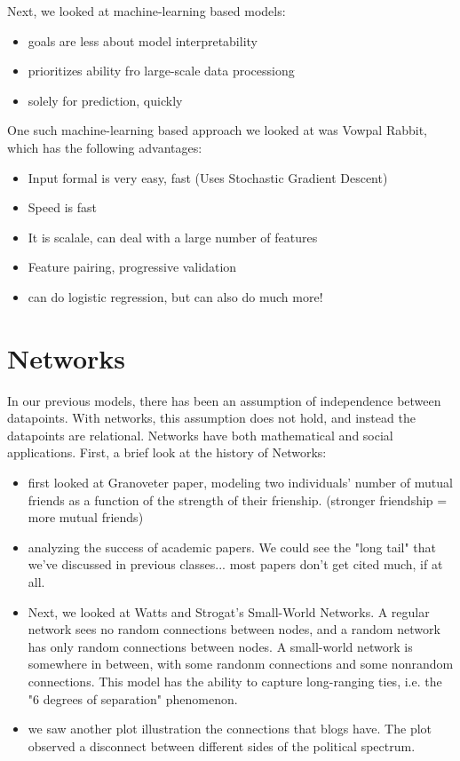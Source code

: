 Next, we looked at machine-learning based models:
\begin{itemize}
  \item goals are less about model interpretability
  \item prioritizes ability fro large-scale data processiong
  \item solely for prediction, quickly
\end{itemize}

One such machine-learning based approach we looked at was Vowpal Rabbit, which has the following advantages:
\begin{itemize}
  \item Input formal is very easy, fast (Uses Stochastic Gradient Descent)
  \item Speed is fast
  \item It is scalale, can deal with a large number of features
  \item Feature pairing, progressive validation
  \item can do logistic regression, but can also do much more!
\end{itemize}



\section{Networks}
In our previous models, there has been an assumption of independence between datapoints. With networks, this assumption does not hold, and instead the datapoints are relational. Networks have both mathematical and social applications. First, a brief look at the history of Networks:
\begin{itemize}
  \item first looked at Granoveter paper, modeling two individuals' number of mutual friends as a function of the strength of their frienship. (stronger friendship = more mutual friends)
  \item analyzing the success of academic papers. We could see the "long tail" that we've discussed in previous classes... most papers don't get cited much, if at all. 
  \item Next, we looked at Watts and Strogat's Small-World Networks. A regular network sees no random connections between nodes, and a random network has only random connections between nodes. A small-world network is somewhere in between, with some randonm connections and some nonrandom connections. This model has the ability to capture long-ranging ties, i.e. the "6 degrees of separation" phenomenon. 
  \item we saw another plot illustration the connections that blogs have. The plot observed a disconnect between different sides of the political spectrum.
\end{itemize}

